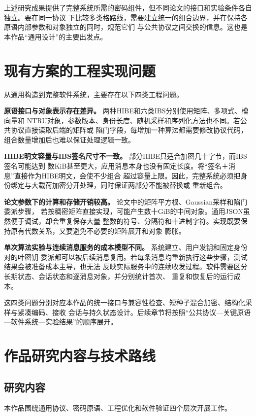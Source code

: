 上述研究成果提供了完整系统所需的密码组件，但不同论文的接口和实验条件各自独立。要在同一协议
下比较多类格路线，需要建立统一的组合边界，并在保持各原语内部参数和对象独立的同时，规范它们
与公共协议之间交换的信息。这也是本作品“通用设计”的主要出发点。

\section{现有方案的工程实现问题}

从通用构造到完整软件系统，主要存在以下四类工程问题。

\textbf{原语接口与对象表示存在差异。} 两种HIBE和六类IBS分别使用矩阵、多项式、模向量和
NTRU对象，参数版本、身份长度、随机采样和序列化方法也不同。若公共协议直接读取后端的矩阵或
陷门字段，每增加一种算法都需要修改协议代码，组合数量增加后也难以保证处理逻辑一致。

\textbf{HIBE明文容量与IBS签名尺寸不一致。} 部分HIBE只适合加密几十字节，而IBS签名可能达到
数KiB甚至更大，应用消息本身也没有固定长度。将“签名＋消息”直接作为HIBE明文，会使不少组合
超过容量上限。因此，完整系统必须把身份绑定与大载荷加密分开处理，同时保证两部分不能被替换或
重新组合。

\textbf{论文参数下的计算和存储开销较高。} 论文中的矩阵平方根、Gaussian采样和陷门委派步骤，
若按稠密矩阵直接实现，可能产生数十GiB的中间对象。通用JSON虽然便于调试，却会重复保存大量
整数的符号、分隔符和十进制字符。实现既要保持原有代数关系，又要避免不必要的矩阵展开和对象
膨胀。

\textbf{单次算法实验与连续消息服务的成本模型不同。} 系统建立、用户发钥和固定身份对的叶密钥
委派都可以被后续消息复用。若每条消息均重新执行这些步骤，测试结果会被准备成本主导，也无法
反映实际服务中的连续收发过程。软件需要区分长期状态、会话状态和逐消息对象，并分别统计首次、
重复和恢复后的运行成本。

这四类问题分别对应本作品的统一接口与兼容性检查、短种子混合加密、结构化采样与紧凑编码、接收
会话与持久状态设计。后续章节将按照“公共协议—关键原语—软件系统—实验结果”的顺序展开。

\section{作品研究内容与技术路线}

\subsection{研究内容}

本作品围绕通用协议、密码原语、工程优化和软件验证四个层次开展工作。


